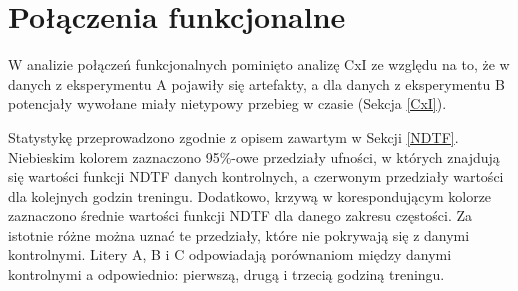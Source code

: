 \documentclass{pracamgr}
\begin{document}
	\section{Połączenia funkcjonalne}
	W analizie połączeń funkcjonalnych pominięto analizę CxI ze względu na to, że w danych z eksperymentu A pojawiły się artefakty, a dla danych z eksperymentu B potencjały wywołane miały nietypowy przebieg w czasie (Sekcja \ref{CxI}).
	
	Statystykę przeprowadzono zgodnie z opisem zawartym w Sekcji \ref{NDTF}. Niebieskim kolorem zaznaczono 95\%-owe przedziały ufności, w których znajdują się wartości funkcji NDTF danych kontrolnych, a czerwonym przedziały wartości dla kolejnych godzin treningu. Dodatkowo, krzywą w korespondującym kolorze zaznaczono średnie wartości funkcji NDTF dla danego zakresu częstości.	
	Za istotnie różne można uznać te przedziały, które nie pokrywają się z danymi kontrolnymi. Litery A, B i C odpowiadają porównaniom między danymi kontrolnymi a odpowiednio: pierwszą, drugą i trzecią godziną treningu.
	
\end{document}
